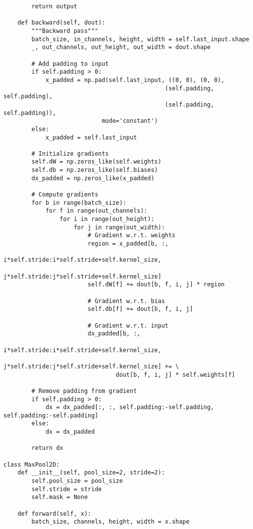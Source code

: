﻿\documentclass[12pt,a4paper]{article}
\begin{document}
\begin{lstlisting}
        return output
    
    def backward(self, dout):
        """Backward pass"""
        batch_size, in_channels, height, width = self.last_input.shape
        _, out_channels, out_height, out_width = dout.shape
        
        # Add padding to input
        if self.padding > 0:
            x_padded = np.pad(self.last_input, ((0, 0), (0, 0), 
                                              (self.padding, self.padding), 
                                              (self.padding, self.padding)), 
                            mode='constant')
        else:
            x_padded = self.last_input
        
        # Initialize gradients
        self.dW = np.zeros_like(self.weights)
        self.db = np.zeros_like(self.biases)
        dx_padded = np.zeros_like(x_padded)
        
        # Compute gradients
        for b in range(batch_size):
            for f in range(out_channels):
                for i in range(out_height):
                    for j in range(out_width):
                        # Gradient w.r.t. weights
                        region = x_padded[b, :, 
                                        i*self.stride:i*self.stride+self.kernel_size,
                                        j*self.stride:j*self.stride+self.kernel_size]
                        self.dW[f] += dout[b, f, i, j] * region
                        
                        # Gradient w.r.t. bias
                        self.db[f] += dout[b, f, i, j]
                        
                        # Gradient w.r.t. input
                        dx_padded[b, :, 
                                i*self.stride:i*self.stride+self.kernel_size,
                                j*self.stride:j*self.stride+self.kernel_size] += \
                                dout[b, f, i, j] * self.weights[f]
        
        # Remove padding from gradient
        if self.padding > 0:
            dx = dx_padded[:, :, self.padding:-self.padding, self.padding:-self.padding]
        else:
            dx = dx_padded
        
        return dx

class MaxPool2D:
    def __init__(self, pool_size=2, stride=2):
        self.pool_size = pool_size
        self.stride = stride
        self.mask = None
    
    def forward(self, x):
        batch_size, channels, height, width = x.shape
        

\end{lstlisting}
\end{document}
